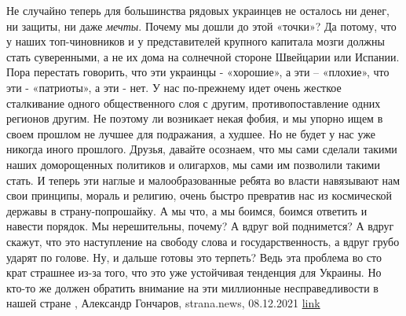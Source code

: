 Не случайно теперь для большинства рядовых украинцев не осталось ни денег, ни
защиты, ни даже \emph{мечты}. Почему мы дошли до этой «точки»? Да потому, что у
наших топ-чиновников и у представителей крупного капитала мозги должны стать
суверенными, а не их дома на солнечной стороне Швейцарии или Испании.  Пора
перестать говорить, что эти украинцы - «хорошие», а эти – «плохие», что эти -
«патриоты», а эти - нет. У нас по-прежнему идет очень жесткое сталкивание
одного общественного слоя с другим, противопоставление одних регионов другим.
Не поэтому ли возникает некая фобия, и мы упорно ищем в своем прошлом не лучшее
для подражания, а худшее. Но не будет у нас уже никогда иного прошлого.
Друзья, давайте осознаем, что мы сами сделали такими наших доморощенных
политиков и олигархов, мы сами им позволили такими стать. И теперь эти наглые и
малообразованные ребята во власти навязывают нам свои принципы, мораль и
религию, очень быстро превратив нас из космической державы в страну-попрошайку.
А мы что, а мы боимся, боимся ответить и навести порядок. Мы нерешительны,
почему? А вдруг вой поднимется? А вдруг скажут, что это наступление на свободу
слова и государственность, а вдруг грубо ударят по голове.  Ну, и дальше готовы
это терпеть? Ведь эта проблема во сто крат страшнее из-за того, что это уже
устойчивая тенденция для Украины. Но кто-то же должен обратить внимание на эти
миллионные несправедливости в нашей стране
, 
Александр Гончаров, strana.news, 08.12.2021
\href{https://strana.news/opinions/366081-dlja-obychnoho-ukraintsa-spravedlivost-vazhnee-chem-zakon.html}{link}
